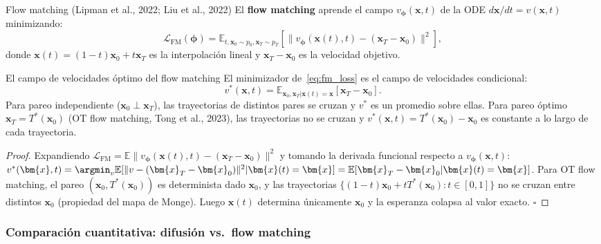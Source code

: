 \begin{definicion}{Flow matching (Lipman et al., 2022; Liu et al., 2022)}
\label{def:flow_matching}
El \textbf{flow matching} aprende el campo $v_{\bm{\phi}}(\bm{x},t)$ de la ODE
$d\bm{x}/dt = v(\bm{x},t)$ minimizando:
\begin{equation}
  \mathcal{L}_{\mathrm{FM}}(\bm{\phi})
  = \mathbb{E}_{t,\bm{x}_0\sim p_0,\bm{x}_T\sim p_T}
  \left[\|v_{\bm{\phi}}(\bm{x}(t),t) - (\bm{x}_T-\bm{x}_0)\|^2\right],
  \label{eq:fm_loss}
\end{equation}
donde $\bm{x}(t) = (1-t)\bm{x}_0 + t\bm{x}_T$ es la interpolación lineal y
$\bm{x}_T-\bm{x}_0$ es la velocidad objetivo.
\end{definicion}

\begin{proposicion}{El campo de velocidades óptimo del flow matching}
\label{prop:fm_campo}
El minimizador de~\eqref{eq:fm_loss} es el campo de velocidades condicional:
\[
  v^*(\bm{x},t)
  = \mathbb{E}_{\bm{x}_0,\bm{x}_T|\bm{x}(t)=\bm{x}}[\bm{x}_T-\bm{x}_0].
\]
Para pareo independiente ($\bm{x}_0 \perp \bm{x}_T$), las trayectorias de
distintos pares se cruzan y $v^*$ es un promedio sobre ellas. Para pareo
óptimo $\bm{x}_T = T^*(\bm{x}_0)$ (OT flow matching, Tong et al., 2023),
las trayectorias no se cruzan y $v^*(\bm{x},t) = T^*(\bm{x}_0) - \bm{x}_0$
es constante a lo largo de cada trayectoria.
\end{proposicion}

\begin{proof}
Expandiendo $\mathcal{L}_{\mathrm{FM}} = \mathbb{E}\|v_{\bm{\phi}}(\bm{x}(t),t)
- (\bm{x}_T-\bm{x}_0)\|^2$ y tomando la derivada funcional respecto a
$v_{\bm{\phi}}(\bm{x},t)$:
$v^*(\bm{x},t) = \argmin_v \mathbb{E}[\|v - (\bm{x}_T-\bm{x}_0)\|^2 |
\bm{x}(t)=\bm{x}] = \mathbb{E}[\bm{x}_T-\bm{x}_0|\bm{x}(t)=\bm{x}]$.
Para OT flow matching, el pareo $(\bm{x}_0,T^*(\bm{x}_0))$ es determinista dado
$\bm{x}_0$, y las trayectorias $\{(1-t)\bm{x}_0+tT^*(\bm{x}_0):t\in[0,1]\}$
no se cruzan entre distintos $\bm{x}_0$ (propiedad del mapa de Monge). Luego
$\bm{x}(t)$ determina únicamente $\bm{x}_0$ y la esperanza colapsa al valor
exacto. $\square$
\end{proof}

\subsubsection*{Comparación cuantitativa: difusión vs.\ flow matching}

